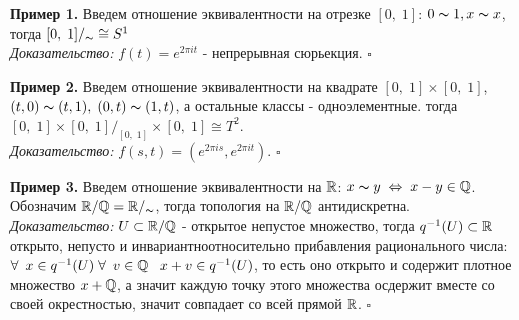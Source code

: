 \documentclass[../../main.tex]{subfiles}
\begin{document}
\textbf{Пример 1.} Введем отношение эквивалентности на отрезке $[0,\;1]$: $0\thicksim 1, x\thicksim x$, тогда $[0,\;1]/_\thicksim \cong S^1$\\
\textit{Доказательство:} $f(t)=e^{2\pi it}$ - непрерывная сюрьекция. $\square$

\textbf{Пример 2.} Введем отношение эквивалентности на квадрате $[0,\;1]\times[0,\;1]$, $(t,0)\thicksim (t,1),\;(0,t)\thicksim(1,t)$, а остальные классы - одноэлементные. тогда $[0,\;1]\times[0,\;1]/_[0,\;1]\times[0,\;1]\cong T^2$.\\
\textit{Доказательство:} $f(s,t) = (e^{2\pi is},e^{2\pi it})$. $\square$

\textbf{Пример 3.} Введем отношение эквивалентности на $\mathbb{R}$: $x\thicksim y\;\Leftrightarrow \;x-y\in\mathbb{Q}$. Обозначим $\mathbb{R}/\mathbb{Q} = \mathbb{R}/_\thicksim$, тогда топология на $\mathbb{R}/\mathbb{Q}$ антидискретна.\\
\textit{Доказательство:} $U\subset \mathbb{R}/\mathbb{Q}$ - открытое непустое множество, тогда $q^{-1}(U)\subset \mathbb{R}$ открыто, непусто и инвариантноотносительно прибавления рационального числа: $\forall\:\;x\in q^{-1}(U)\;\forall\:\; v\in\mathbb{Q}\;\;\;x+v\in q^{-1}(U)$, то есть оно открыто и содержит плотное множество $x+\mathbb{Q}$, а значит каждую точку этого множества осдержит вместе со своей окрестностью, значит совпадает со всей прямой $\mathbb{R}$. $\square$
\end{document}
